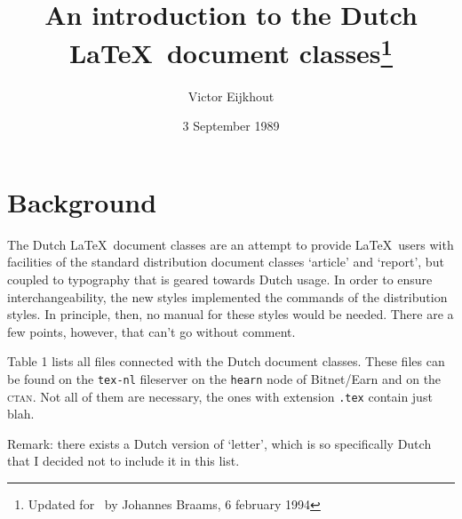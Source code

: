 \documentclass[a4paper,10pt]{artikel1} %
\newcommand\file[1]{\texttt{#1}}
\begin{document}
\title{An introduction to the Dutch \LaTeX\ document
  classes\thanks{Updated for \LaTeXe\ by Johannes Braams, 6 february
    1994}}
\author{Victor Eijkhout}
\date{3 September 1989}
\maketitle

\section{Background}

The Dutch \LaTeX\ document classes are an attempt to provide \LaTeX\ 
users with facilities of the standard distribution document classes
`article' and `report', but coupled to typography that is geared
towards Dutch usage.  In order to ensure interchangeability, the new
styles implemented the commands of the distribution styles.  In
principle, then, no manual for these styles would be needed.  There
are a few points, however, that can't go without comment.

Table 1 lists all files connected with the Dutch document classes.
These files can be found on the \texttt{tex-nl} fileserver
on the \texttt{hearn} node of Bitnet/Earn and on the \textsc{ctan}.
Not all of them are necessary, the ones with extension \file{.tex}
contain just blah.

Remark: there exists a Dutch version of `letter', which is so
specifically Dutch that I decided not to include it in this list.
\end{document}
